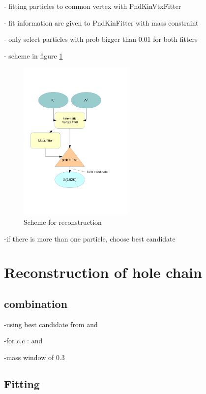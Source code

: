 		- fitting particles to common vertex with PndKinVtxFitter
		
		- fit information are given to PndKinFitter with mass constraint
		
		- only select particles with prob bigger than 0.01 for both fitters
		
		- scheme in figure \ref{fig:excitedcascade_scheme}
		
		\begin{figure}
			\centering
				\includegraphics[width=0.50\textwidth]{./plots/combineExcitedCascade.pdf}
			\caption{Scheme for \excitedcascade reconstruction}
			\label{fig:excitedcascade_scheme}
		\end{figure}
		
		-if there is more than one particle, choose best candidate
	
\section{Reconstruction of hole chain}

	\subsection{combination}
	
	-using best candidate from \excitedcascade and \anticascade
	
	-for c.c : \excitedanticascade and \cascade
	
	-mass window of $0.3$\massunit
	
	
	\subsection{Fitting}
	
